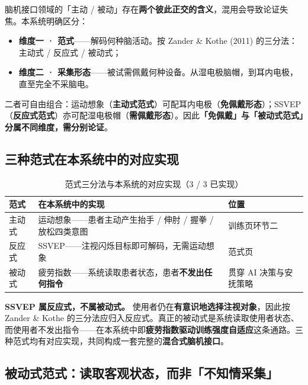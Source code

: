 \documentclass[11pt, a4paper]{ctexart}
\begin{document}
\begin{warnbox}
脑机接口领域的「主动 / 被动」存在\textbf{两个彼此正交的含义}，混用会导致论证失焦。本系统明确区分：

\begin{itemize}[itemsep=2pt, topsep=3pt]
  \item \textbf{维度一 · 范式}——解码何种脑活动。按 Zander \& Kothe (2011) 的三分法：主动式 / 反应式 / 被动式；
  \item \textbf{维度二 · 采集形态}——被试需佩戴何种设备。从湿电极脑帽，到耳内电极，直至完全不采脑电。
\end{itemize}

二者可自由组合：运动想象（\textbf{主动式范式}）可配耳内电极（\textbf{免佩戴形态}）；SSVEP（\textbf{反应式范式}）亦可配湿电极帽（\textbf{需佩戴形态}）。因此\textbf{「免佩戴」与「被动式范式」分属不同维度，需分别论证}。
\end{warnbox}

\subsection{三种范式在本系统中的对应实现}

\begin{table}[htbp]
\centering
\caption{范式三分法与本系统的对应实现（3 / 3 已实现）}
\begin{tabularx}{\textwidth}{@{}l X l@{}}
\toprule
\sffamily\bfseries 范式 & \sffamily\bfseries 在本系统中的实现 & \sffamily\bfseries 位置 \\
\midrule
主动式 & 运动想象——患者主动产生抬手 / 伸肘 / 握拳 / 放松四类意图 & 训练页环节二 \\
反应式 & SSVEP——注视闪烁目标即可解码，无需运动想象 & 范式页 \\
被动式 & 疲劳指数——系统读取患者状态，患者\textbf{不发出任何指令} & 贯穿 AI 决策与安抚策略 \\
\bottomrule
\end{tabularx}
\end{table}

\begin{keybox}
\textbf{SSVEP 属反应式，不属被动式。} 使用者仍在\textbf{有意识地选择注视对象}，因此按 Zander \& Kothe 的三分法应归入反应式。真正的被动式是系统读取使用者状态、而使用者不发出指令——在本系统中即\textbf{疲劳指数驱动训练强度自适应}这条通路。三种范式均有对应实现，共同构成一套完整的\textbf{混合式脑机接口}。
\end{keybox}

\subsection{被动式范式：读取客观状态，而非「不知情采集」}
\end{document}
